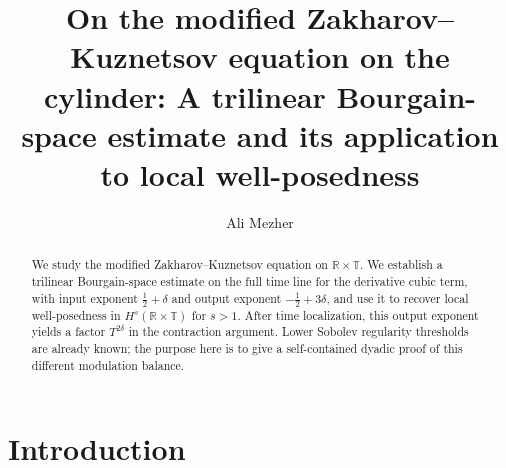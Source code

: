 \documentclass[12pt,oneside,reqno]{amsart}
\numberwithin{equation}{section}
\theoremstyle{plain}
\def\R{{\mathbb R}}
\def\T{{\mathbb T}}
\begin{document}
 
    
\title[On the modified Zakharov--Kuznetsov equation on the cylinder]
{On the modified Zakharov--Kuznetsov equation on the cylinder:
A trilinear Bourgain-space estimate and its application to local well-posedness}
    
\author{Ali Mezher}

\address{Department of Mathematics, University of Texas at Austin, Austin, TX 78712, USA}




\begin{abstract}
We study the modified Zakharov--Kuznetsov equation on $\R\times\T$. We establish a trilinear Bourgain-space estimate on the full time line for the derivative cubic term, with input exponent $\frac12+\delta$ and output exponent $-\frac12+3\delta$, and use it to recover local well-posedness in $H^s(\R\times\T)$ for $s>1$. After time localization, this output exponent yields a factor $T^{2\delta}$ in the contraction argument. Lower Sobolev regularity thresholds are already known; the purpose here is to give a self-contained dyadic proof of this different modulation balance.
\end{abstract}

\maketitle

\bigskip
%
\bigskip
%


\setcounter{tocdepth}{2}
\tableofcontents




\section{Introduction}
\end{document}
